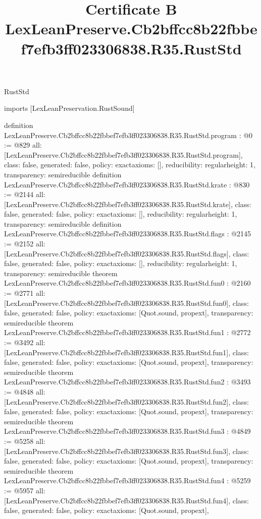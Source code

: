 \begin{lexlean}{RustStd}
\title{Certificate B LexLeanPreserve.Cb2bffcc8b22fbbef7efb3ff023306838.R35.RustStd}
\begin{coremodule}
imports [LexLeanPreservation.RustSound]

definition LexLeanPreserve.Cb2bffcc8b22fbbef7efb3ff023306838.R35.RustStd.program : @0 := @829 {
  all: [LexLeanPreserve.Cb2bffcc8b22fbbef7efb3ff023306838.R35.RustStd.program],
  class: false,
  generated: false,
  policy: exact{axioms: []},
  reducibility: regular{height: 1},
  transparency: semireducible
}
definition LexLeanPreserve.Cb2bffcc8b22fbbef7efb3ff023306838.R35.RustStd.krate : @830 := @2144 {
  all: [LexLeanPreserve.Cb2bffcc8b22fbbef7efb3ff023306838.R35.RustStd.krate],
  class: false,
  generated: false,
  policy: exact{axioms: []},
  reducibility: regular{height: 1},
  transparency: semireducible
}
definition LexLeanPreserve.Cb2bffcc8b22fbbef7efb3ff023306838.R35.RustStd.flags : @2145 := @2152 {
  all: [LexLeanPreserve.Cb2bffcc8b22fbbef7efb3ff023306838.R35.RustStd.flags],
  class: false,
  generated: false,
  policy: exact{axioms: []},
  reducibility: regular{height: 1},
  transparency: semireducible
}
theorem LexLeanPreserve.Cb2bffcc8b22fbbef7efb3ff023306838.R35.RustStd.fun0 : @2160 := @2771 {
  all: [LexLeanPreserve.Cb2bffcc8b22fbbef7efb3ff023306838.R35.RustStd.fun0],
  class: false,
  generated: false,
  policy: exact{axioms: [Quot.sound, propext]},
  transparency: semireducible
}
theorem LexLeanPreserve.Cb2bffcc8b22fbbef7efb3ff023306838.R35.RustStd.fun1 : @2772 := @3492 {
  all: [LexLeanPreserve.Cb2bffcc8b22fbbef7efb3ff023306838.R35.RustStd.fun1],
  class: false,
  generated: false,
  policy: exact{axioms: [Quot.sound, propext]},
  transparency: semireducible
}
theorem LexLeanPreserve.Cb2bffcc8b22fbbef7efb3ff023306838.R35.RustStd.fun2 : @3493 := @4848 {
  all: [LexLeanPreserve.Cb2bffcc8b22fbbef7efb3ff023306838.R35.RustStd.fun2],
  class: false,
  generated: false,
  policy: exact{axioms: [Quot.sound, propext]},
  transparency: semireducible
}
theorem LexLeanPreserve.Cb2bffcc8b22fbbef7efb3ff023306838.R35.RustStd.fun3 : @4849 := @5258 {
  all: [LexLeanPreserve.Cb2bffcc8b22fbbef7efb3ff023306838.R35.RustStd.fun3],
  class: false,
  generated: false,
  policy: exact{axioms: [Quot.sound, propext]},
  transparency: semireducible
}
theorem LexLeanPreserve.Cb2bffcc8b22fbbef7efb3ff023306838.R35.RustStd.fun4 : @5259 := @5957 {
  all: [LexLeanPreserve.Cb2bffcc8b22fbbef7efb3ff023306838.R35.RustStd.fun4],
  class: false,
  generated: false,
  policy: exact{axioms: [Quot.sound, propext]},
}
\end{coremodule}
\end{lexlean}
